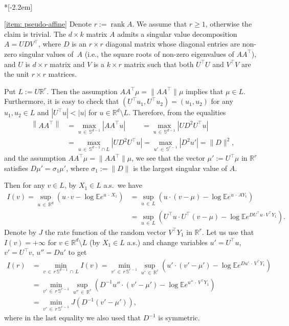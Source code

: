 \documentclass[AHL,Unicode,published]{cedram}
\newcommand{\ubar}[1]{\underline{#1}}
\newcommand{\Rbb}{\mathbb{R}}
\newcommand{\E}{\mathbb{E}}
\newcommand{\Sbb}{\mathbb{S}}
\newcommand{\rank}{\mathop{\mathrm{rank}}\nolimits}
\begin{document}
\begin{proofc}\ \\*[-2.2em]

\eqref{item: pseudo-affine} Denote $r:=\rank A$. We assume that $r \ge 1$, otherwise the claim is trivial. The $d \times k$ matrix $A$ admits a singular value decomposition $A = U D V^\top$, where $D$ is an $r \times r$ diagonal matrix whose diagonal entries are non-zero singular values of~$A$ (i.e., the square roots of non-zero eigenvalues of $A A^\top$), and $U$ is $d \times r$ matrix and $V$ is a $k \times r$ matrix such that both $U^\top U$ and $V^\top V$ are the unit $r \times r$ matrices.

Put $L:= U \Rbb^r$. Then the assumption $A A^\top \mu =\|A A^\top \! \| \mu$ implies that $\mu \in L$. Furthermore, it is easy to check that $(U^\top u_1, U^\top u_2) = (u_1, u_2)$ for any $u_1, u_2 \in L$ and $|U^\top u|<|u|$ for $u \in \Rbb^d \setminus L$. Therefore, from the equalities
\begin{align*}
\left\|A A^\top \! \right\| &= \max_{u\,\in\,\Sbb^{d-1}} \left|A A^\top u\right| \qquad\; = \max_{u\,\in\,\Sbb^{d-1}} \left|U D^2 U^\top u\right| \\
&= \max_{u\,\in\,\Sbb^{d-1} \cap L} \left|U D^2 U^\top u\right| =
\max_{u'\,\in\,\Sbb^{r-1}} \left|D^2 u'\right| = \| D\|^2,
\end{align*}
and the assumption $A A^\top \mu =\|A A^\top \! \| \mu$, we see that the vector $\mu':= U^\top \mu$ in $\Rbb^r$ satisfies $D \mu' = \sigma_1 \mu'$, where $\sigma_1:=\|D\|$ is the largest singular value of $A$.

Then for any $v \in L$, by $X_1 \in L$ a.s.\ we have
\begin{align*}
I(v)= \sup_{u\,\in\,\Rbb^d} \left(u \cdot v - \log \E e^{u \,\cdot\,X_1} \right) &=\sup_{u\,\in\,L} \left(u \cdot (v-\mu) - \log \E e^{u\,\cdot\,A Y_1} \right) \\
&= \sup_{u\,\in\,L} \left(U^\top u \cdot U^\top (v - \mu) - \log \E e^{DU^\top u \cdot V^\top Y_1} \right).
\end{align*}
Denote by $J$ the rate function of the random vector $V^\top Y_1$ in $\Rbb^r$. Let us use that $I(v)=+\infty$ for $v \in \Rbb^d \setminus L$ (by $X_1 \in L$ a.s.) and change variables $u' = U^\top u$, $v'= U^\top v$, $u''=Du'$ to get
\begin{align*}
\ubar I (r) &= \min_{v\,\in \,r\,\Sbb^{d-1}\,\cap\,L} I(v) =
\min_{v'\,\in\,r\,\Sbb^{r-1}} \sup_{u'\,\in\,\Rbb^r} \left(u' \cdot (v' - \mu') - \log \E e^{D u'\,\cdot\,V^\top Y_1} \right) \\
& = \min_{v'\,\in\,r\,\Sbb^{r-1}} \sup_{u''\,\in\,\Rbb^r} \left(D^{-1} u'' \cdot (v' - \mu') - \log \E e^{u''\,\cdot\,V^\top Y_1} \right)\\
&= \min_{v'\,\in\,r\,\Sbb^{r-1}} J \left(D^{-1} (v' - \mu')\right),
\end{align*}
where in the last equality we also used that $D^{-1}$ is symmetric.


\end{proofc}
\end{document}
